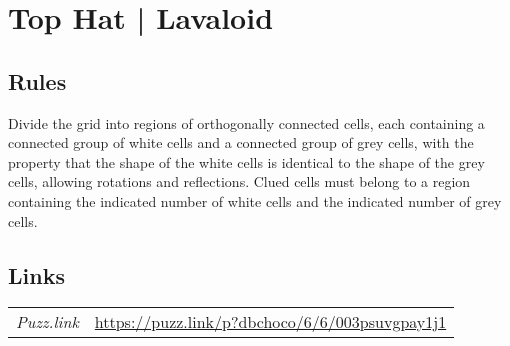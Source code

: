 \section{Top Hat | {\normalfont Lavaloid}}
\label{sec:34-top-hat-lavaloid}

\subsection*{Rules}
\begin{markdown}
Divide the grid into regions of orthogonally connected cells, each containing a connected group of white cells and a connected group of grey cells, with the property that the shape of the white cells is identical to the shape of the grey cells, allowing rotations and reflections. Clued cells must belong to a region containing the indicated number of white cells and the indicated number of grey cells.
\end{markdown}
\subsection*{Links}
\begin{tabularx}{\textwidth}{l X}
\emph{Puzz.link} & \url{https://puzz.link/p?dbchoco/6/6/003psuvgpay1j1} \\
\end{tabularx}
\pagebreak
